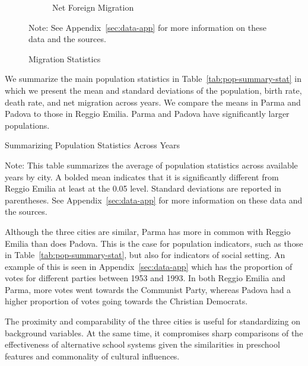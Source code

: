 \begin{figure}[H]
\begin{center}
\begin{subfigure}[ht]{0.48\textwidth}
        \caption{Net Foreign Migration}
        \end{subfigure}
      \caption{Migration Statistics}  \label{fig:emigr-immigr}
      \end{center}
         \raggedright  Note: See Appendix~\ref{sec:data-app} for more information on these data and the sources.
    \end{figure}

We summarize the main population statistics in Table~\ref{tab:pop-summary-stat} in which we present the mean and standard deviations of the population, birth rate, death rate, and net migration across years. We compare the means in Parma and Padova to those in Reggio Emilia. Parma and Padova have significantly larger populations.

    \begin{table}[H]
    \centering
    \caption{Summarizing Population Statistics Across Years} \label{tab:pop-summary-stat}
    \begin{threeparttable}
	
	
\begin{tablenotes}
\item \footnotesize Note: This table summarizes the average of population statistics across available years by city. A bolded mean indicates that it is significantly different from Reggio Emilia at least at the 0.05 level. Standard deviations are reported in parentheses. See Appendix~\ref{sec:data-app} for more information on these data and the sources.
\end{tablenotes}
\end{threeparttable}
\end{table}

Although the three cities are similar, Parma has more in common with Reggio Emilia than does Padova. This is the case for population indicators, such as those in Table~\ref{tab:pop-summary-stat}, but also for indicators of social setting. An example of this is seen in Appendix~\ref{sec:data-app} which has the proportion of votes for different parties between 1953 and 1993. In both Reggio Emilia and Parma, more votes went towards the Communist Party, whereas Padova had a higher proportion of votes going towards the Christian Democrats.

The proximity and comparability of the three cities is useful for standardizing on background variables. At the same time, it compromises sharp comparisons of the effectiveness of alternative school systems given the similarities in preschool features and commonality of cultural influences.
	
